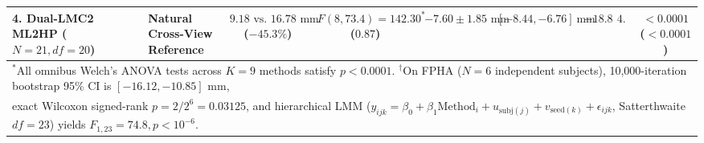 \documentclass[10pt,twocolumn]{article}
\begin{document}
\begin{table}[!t]
{\begin{tabular}{llccccccc}
\midrule
\textbf{4. Dual-LMC2 ML2HP} ($N=21, df=20$)
& Natural Cross-View Reference & $9.18\text{ vs.\ }16.78\text{ mm}$ ($-45.3\%$) & $F(8,73.4)=142.30^*$ ($0.87$) & $-7.60 \pm 1.85\text{ mm}$ & $[-8.44, -6.76]\text{ mm}$ & $-18.82$ & $4.11$ & $< 0.0001$ ($< 0.0001$) \\
\bottomrule
\multicolumn{9}{l}{\footnotesize $^*$All omnibus Welch's ANOVA tests across $K=9$ methods satisfy $p < 0.0001$. $^\dagger$On FPHA ($N=6$ independent subjects), 10,000-iteration bootstrap 95\% CI is $[-16.12, -10.85]\text{ mm}$,} \\
\multicolumn{9}{l}{\footnotesize exact Wilcoxon signed-rank $p = 2/2^6 = 0.03125$, and hierarchical LMM ($y_{ijk} = \beta_0 + \beta_1\text{Method}_i + u_{\text{subj}(j)} + v_{\text{seed}(k)} + \epsilon_{ijk}$, Satterthwaite $df=23$) yields $F_{1,23} = 74.8, p < 10^{-6}$.}
\end{tabular}
}
\end{table}
\end{document}
